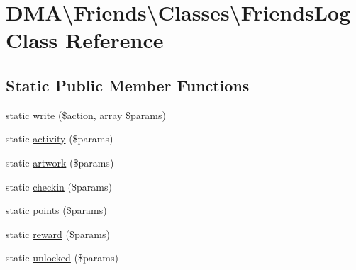 \hypertarget{classDMA_1_1Friends_1_1Classes_1_1FriendsLog}{\section{D\+M\+A\textbackslash{}Friends\textbackslash{}Classes\textbackslash{}Friends\+Log Class Reference}
\label{classDMA_1_1Friends_1_1Classes_1_1FriendsLog}
}
\subsection*{Static Public Member Functions}
\begin{DoxyCompactItemize}
\item 
static \hyperlink{classDMA_1_1Friends_1_1Classes_1_1FriendsLog_a99a5a2ee4bc69aab07f58308d9cee669}{write} (\$action, array \$params)
\item 
static \hyperlink{classDMA_1_1Friends_1_1Classes_1_1FriendsLog_a0b90db29da51f53991f2dcc1a55f14c7}{activity} (\$params)
\item 
static \hyperlink{classDMA_1_1Friends_1_1Classes_1_1FriendsLog_aa3c63d0a5b1ffcd9f58c03e443a2dc8f}{artwork} (\$params)
\item 
static \hyperlink{classDMA_1_1Friends_1_1Classes_1_1FriendsLog_ae6c33847a3d3f094a3bd27ac2dbbfa72}{checkin} (\$params)
\item 
static \hyperlink{classDMA_1_1Friends_1_1Classes_1_1FriendsLog_a083fa01b3e143ca77bdbb1562db724de}{points} (\$params)
\item 
static \hyperlink{classDMA_1_1Friends_1_1Classes_1_1FriendsLog_a9f38b9c2e3b1c9d36bc7a1247b2571eb}{reward} (\$params)
\item 
static \hyperlink{classDMA_1_1Friends_1_1Classes_1_1FriendsLog_ac7705d4873f6b3156efde3e049a21ca6}{unlocked} (\$params)
\end{DoxyCompactItemize}


